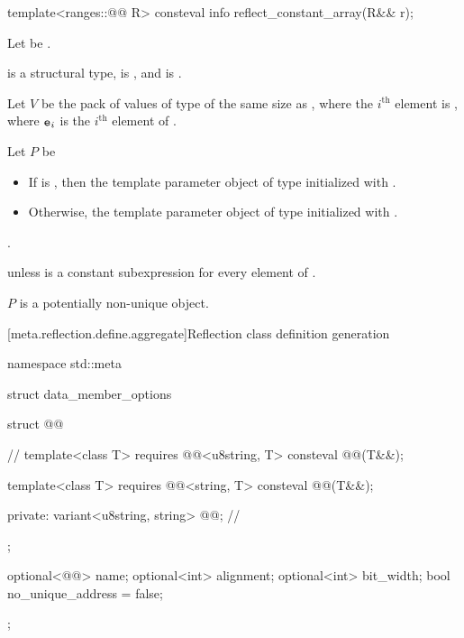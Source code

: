 %
\begin{itemdecl}
template<ranges::@@ R>
  consteval info reflect_constant_array(R&& r);
\end{itemdecl}

\begin{itemdescr}
\pnum
Let  be .

\pnum
\mandates
{} is a structural type,
 is , and
 is .

\pnum
Let $V$ be the pack of values of type 
of the same size as ,
where the $i^\text{th}$ element is ,
where $\tcode{e}_i$ is the $i^\text{th}$ element of .

\pnum
Let $P$ be
\begin{itemize}
\item
  If  is ,
  then the template parameter object
  of type 
  initialized with .
\item
  Otherwise, the template parameter object
  of type 
  initialized with \tcode{\{\}}.
\end{itemize}

\pnum
\returns
{}.

\pnum
\throws
{} unless
 is a constant subexpression
for every element  of .

\pnum
\begin{note}
$P$ is a potentially non-unique object.
\end{note}
\end{itemdescr}

[meta.reflection.define.aggregate]{Reflection class definition generation}

%
\begin{codeblock}
namespace std::meta {
  struct data_member_options {
    struct @@ {                          // \expos
      template<class T>
        requires @@<u8string, T>
        consteval @@(T&&);

      template<class T>
        requires @@<string, T>
        consteval @@(T&&);

    private:
      variant<u8string, string> @@;       // \expos
    };

    optional<@@> name;
    optional<int> alignment;
    optional<int> bit_width;
    bool no_unique_address = false;
  };
}
\end{codeblock}

